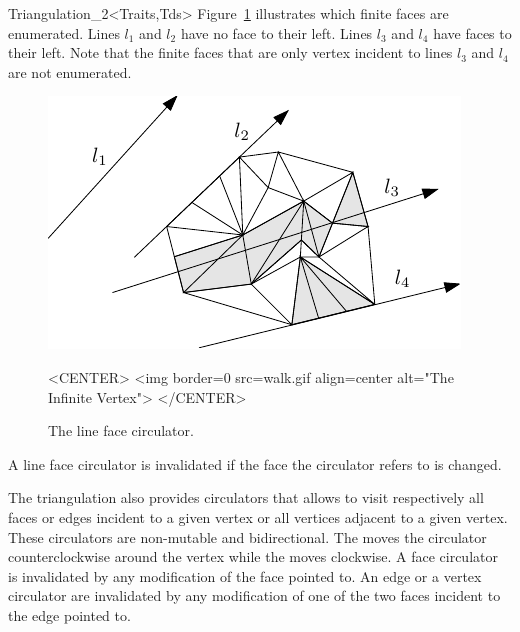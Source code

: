 \begin{ccRefClass}{Triangulation_2<Traits,Tds>}
Figure~\ref{Triangulation_ref_Fig_Line_face_circulator} illustrates which finite faces are enumerated. Lines
$l_1$ and $l_2$ have no face to their left. Lines $l_3$ and $l_4$
have faces to their left. Note that the finite faces that are only vertex
incident to lines $l_3$ and  $l_4$ are not enumerated.

\begin{figure}
\begin{ccTexOnly}
\begin{center}  \includegraphics{Triangulation_2/walk} \end{center}
\end{ccTexOnly} 
\caption{The line face circulator.
\label{Triangulation_ref_Fig_Line_face_circulator}}

\begin{ccHtmlOnly}
<CENTER>
<img border=0 src=walk.gif align=center alt="The Infinite Vertex">
</CENTER>
\end{ccHtmlOnly} 
\end{figure}

A line face circulator is invalidated if the face the circulator refers
to is changed.

\ccThreeToTwo




The triangulation also provides circulators that allows to visit 
respectively all faces or edges incident to a given vertex
or all vertices adjacent to a given vertex.
These circulators are
non-mutable
and bidirectional.
 The  moves the circulator
counterclockwise around the vertex while
the  moves clockwise.
A face circulator is invalidated by any modification of the face pointed to.
An edge or a vertex circulator are invalidated by any modification
of one of the two faces incident to the edge pointed to.


\end{ccRefClass}
